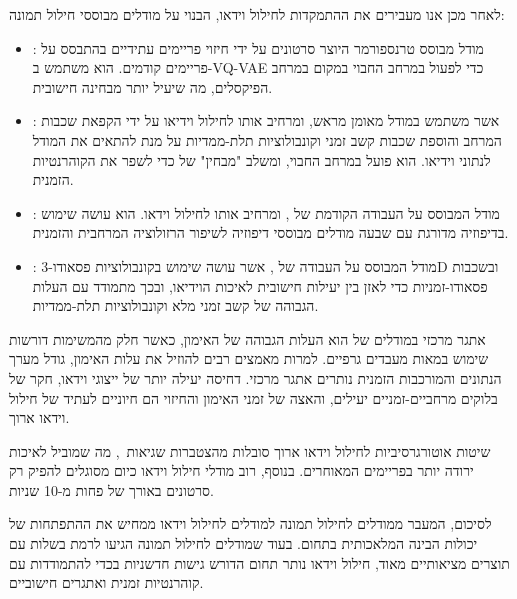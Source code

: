 \begin{hebrew}
\begin{RTL}
לאחר מכן אנו מעבירים את ההתמקדות לחילול וידאו, הבנוי על מודלים מבוססי חילול תמונה:





\begin{itemize}
    \item \textbf{}: מודל מבוסס טרנספורמר היוצר סרטונים על ידי חיזוי פריימים עתידיים בהתבסס על פריימים קודמים. הוא משתמש ב-VQ-VAE כדי לפעול במרחב החבוי במקום במרחב הפיקסלים, מה שיעיל יותר מבחינה חישובית.
    
    \item \textbf{}: אשר משתמש במודל  מאומן מראש,
    ומרחיב אותו לחילול וידיאו על ידי הקפאת שכבות המרחב והוספת שכבות קשב זמני וקונבולוציות תלת-ממדיות על מנת להתאים את המודל לנתוני וידיאו.
    הוא פועל במרחב החבוי, ומשלב "מבחין" של 
    כדי לשפר את הקוהרנטיות הזמנית.

    \item \textbf{}: מודל  המבוסס על העבודה הקודמת של , ומרחיב אותו לחילול וידאו.
    הוא עושה שימוש בדיפוזיה מדורגת עם שבעה מודלים מבוססי דיפוזיה לשיפור הרזולוציה המרחבית והזמנית.

    \item \textbf{}: מודל המבוסס על העבודה של , 
    אשר עושה שימוש בקונבולוציות פסאודו-3D
    ובשכבות פסאודו-זמניות
    כדי לאזן בין יעילות חישובית לאיכות הוידיאו,
    ובכך מתמודד עם העלות הגבוהה של קשב זמני מלא וקונבולוציות תלת-ממדיות.


\end{itemize}





אתגר מרכזי במודלים של  הוא העלות הגבוהה של האימון, כאשר חלק מהמשימות דורשות שימוש במאות מעבדים גרפיים.
למרות מאמצים רבים להוזיל את עלות האימון, גודל מערך הנתונים  והמורכבות הזמנית נותרים אתגר מרכזי.
דחיסה יעילה יותר של ייצוגי וידאו, חקר של בלוקים מרחביים-זמניים יעילים, והאצה של זמני האימון והחיזוי הם חיוניים לעתיד
של חילול וידאו ארוך.

שיטות אוטורגרסיביות לחילול וידאו ארוך סובלות מהצטברות שגיאות~\cite{ouyang2024flexifilm},
מה שמוביל לאיכות ירודה יותר בפריימים המאוחרים. בנוסף, רוב מודלי חילול וידאו כיום מסוגלים להפיק
רק סרטונים באורך של פחות מ-10 שניות.

לסיכום, המעבר ממודלים לחילול תמונה למודלים לחילול וידאו ממחיש את ההתפתחות של יכולות הבינה המלאכותית בתחום.
בעוד שמודלים לחילול תמונה הגיעו לרמת בשלות עם תוצרים מציאותיים מאוד, חילול וידאו נותר תחום הדורש גישות חדשניות בכדי להתמודדות עם קוהרנטיות זמנית ואתגרים חישוביים.





\end{RTL}
\end{hebrew}





